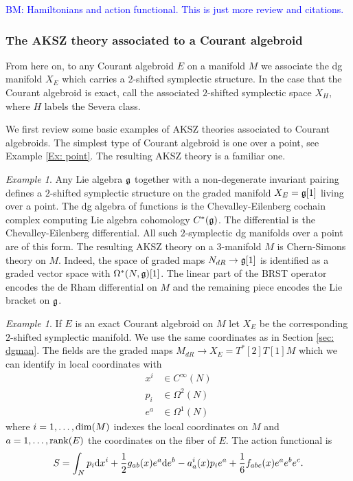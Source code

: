 \documentclass[letterpaper,12pt]{article}
\def\d{{\rm d}}
\theoremstyle{definition}
\theoremstyle{remark}
\theoremstyle{examples}
\newtheorem{Ex}[theorem]{Example}
\def\brian{\textcolor{blue}{BM: }\textcolor{blue}}
\begin{document}
\brian{Hamiltonians and action functional. This is just more review and citations.}

\subsubsection{The AKSZ theory associated to a Courant algebroid}

From here on, to any Courant algebroid $E$ on a manifold $M$ we associate the dg manifold $X_E$ which carries a $2$-shifted symplectic structure. 
In the case that the Courant algebroid is exact, call the associated $2$-shifted symplectic space $X_H$, where $H$ labels the Severa class. 

We first review some basic examples of AKSZ theories associated to Courant algebroids. 
The simplest type of Courant algebroid is one over a point, see Example \ref{Ex: point}. 
The resulting AKSZ theory is a familiar one.

\begin{Ex}\label{ex: cs}
Any Lie algebra $\mathfrak{g}$ together with a non-degenerate invariant pairing defines a $2$-shifted symplectic structure on the graded manifold $X_E = \mathfrak{g}[1]$ living over a point. 
The dg algebra of functions is the Chevalley-Eilenberg cochain complex computing Lie algebra cohomology $C^*(\mathfrak{g})$. 
The differential is the Chevalley-Eilenberg differential.
All such $2$-symplectic dg manifolds over a point are of this form. 
The resulting AKSZ theory on a $3$-manifold $M$ is Chern-Simons theory on $M$. 
Indeed, the space of graded maps $N_{dR} \to \mathfrak{g}[1]$ is identified as a graded vector space with $\Omega^*(N, \mathfrak{g})[1]$.
The linear part of the BRST operator encodes the de Rham differential on $M$ and the remaining piece encodes the Lie bracket on $\mathfrak{g}$. 
\end{Ex}

\begin{Ex} \label{ex: exact CA}
If $E$ is an exact Courant algebroid on $M$ let $X_E$ be the corresponding $2$-shifted symplectic manifold.
We use the same coordinates as in Section \ref{sec: dgman}.
The fields are the graded maps $M_{dR} \to X_E = T^*[2] T[1] M$ which we can identify in local coordinates with
\begin{align*}
x^i &\in C^\infty(N) \\
p_i & \in \Omega^2(N) \\
e^a & \in \Omega^1(N) 
\end{align*}
where $i = 1,\ldots, {\rm dim}(M)$ indexes the local coordinates on $M$ and $a = 1, \ldots, {\rm rank}(E)$ the coordinates on the fiber of $E$.
The action functional is
\[
S = \int_N p_i \d x^i + \frac{1}{2} g_{ab}(x) e^a \d e^b - a_a^i(x) p_i e^a + \frac{1}{6} f_{abc} (x) e^{a} e^b e^c .
\]
\end{Ex}
\end{document}
